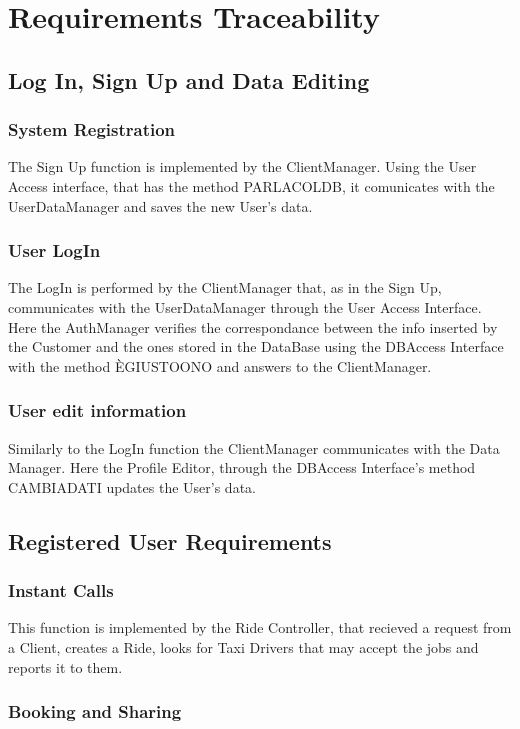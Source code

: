 \section{Requirements Traceability}
	\subsection {Log In, Sign Up and Data Editing}

		\subsubsection{System Registration}
		The Sign Up function is implemented by the ClientManager. Using the User Access interface, that has the method PARLACOLDB, it comunicates with the UserDataManager and saves the new User's data.
		
		\subsubsection{User LogIn}
		The LogIn is performed by the ClientManager that, as in the Sign Up, communicates with the UserDataManager through the User Access Interface. Here the AuthManager verifies the correspondance between the info inserted by the Customer and the ones stored in the DataBase using the DBAccess Interface with the method ÈGIUSTOONO and answers to the ClientManager.
		
		\subsubsection{User edit information}
		Similarly to the LogIn function the ClientManager communicates with the Data Manager. Here the Profile Editor, through the DBAccess Interface's method CAMBIADATI updates the User's data.
		
		\newpage
	\subsection {Registered User Requirements}
	
		
		\subsubsection{Instant Calls}
		This function is implemented by the Ride Controller, that recieved a request from a Client, creates a Ride, looks for Taxi Drivers that may accept the jobs and reports it to them. \askpippo
		
		\subsubsection{Booking and Sharing}
